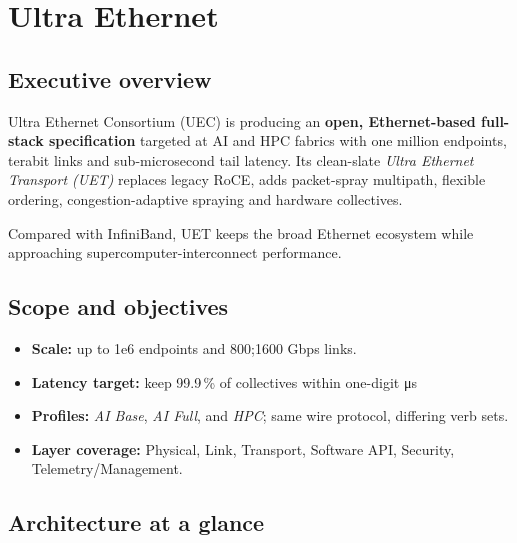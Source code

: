 \documentclass[../../../OAE-SPEC-MAIN.tex]{subfiles}
\begin{document}
\section{Ultra Ethernet}

\subsection{Executive overview}

Ultra Ethernet Consortium (UEC) is producing an \textbf{open, Ethernet-based full-stack
specification} targeted at AI and HPC fabrics with one million endpoints,
terabit links and sub-microsecond tail latency.
Its clean-slate \emph{Ultra Ethernet Transport (UET)} replaces legacy RoCE,
adds packet-spray multipath, flexible ordering, congestion-adaptive spraying
and hardware collectives.

Compared with InfiniBand, UET keeps the broad Ethernet ecosystem while
approaching supercomputer-interconnect performance.

\subsection{Scope and objectives}

\begin{itemize}
  \item \textbf{Scale:} up to 1e6 endpoints and 800;1600 Gbps links.
  \item \textbf{Latency target:} keep 99.9\,\% of collectives within one-digit
        \si{\micro\second}
  \item \textbf{Profiles:} \emph{AI Base}, \emph{AI Full}, and \emph{HPC}; same wire
        protocol, differing verb sets.
  \item \textbf{Layer coverage:} Physical, Link, Transport, Software API,
        Security, Telemetry/Management.
\end{itemize}

\subsection{Architecture at a glance}
\end{document}
